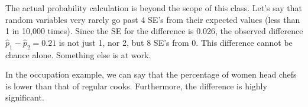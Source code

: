 \documentclass[11pt]{book}\usepackage[]{graphicx}\usepackage[]{color}
\begin{document}
The actual probability calculation is beyond the scope of this class.  Let's say that random variables very rarely go past 4 SE's from their expected values (less than 1 in 10,000 times).  Since the SE for the difference is 0.026, the observed difference $\hat{p}_1 - \hat{p}_2 = 0.21$  is not just 1, nor 2, but 8 SE's from 0.  This difference cannot be chance alone.   Something else is at work.

\begin{center}
\end{center}

In the occupation example, we can say that the percentage of women head chefs
is lower than that of regular cooks.  Furthermore, the difference is highly significant.
\end{document}
